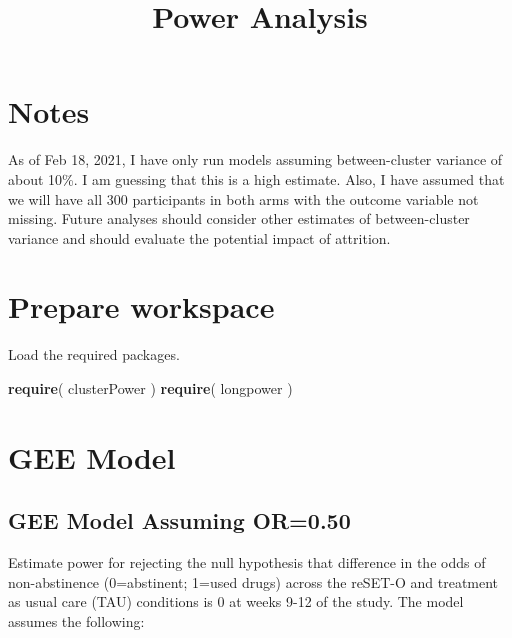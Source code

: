 \documentclass[
]{article}
\title{Power Analysis}
\author{}
\date{\vspace{-2.5em}}
\newenvironment{Shaded}{\begin{snugshade}}{\end{snugshade}}
\newcommand{\KeywordTok}[1]{\textcolor[rgb]{0.13,0.29,0.53}{\textbf{#1}}}
\newcommand{\NormalTok}[1]{#1}
\begin{document}
\maketitle

{
\setcounter{tocdepth}{1}
\tableofcontents
}
\hypertarget{notes}{%
\section{Notes}\label{notes}}

As of Feb 18, 2021, I have only run models assuming between-cluster
variance of about 10\%. I am guessing that this is a high estimate.
Also, I have assumed that we will have all 300 participants in both arms
with the outcome variable not missing. Future analyses should consider
other estimates of between-cluster variance and should evaluate the
potential impact of attrition.

\hypertarget{prepare-workspace}{%
\section{Prepare workspace}\label{prepare-workspace}}

Load the required packages.

\begin{Shaded}
\begin{Highlighting}[]
\KeywordTok{require}\NormalTok{( clusterPower )}
\KeywordTok{require}\NormalTok{( longpower )}
\end{Highlighting}
\end{Shaded}

\hypertarget{gee-model}{%
\section{GEE Model}\label{gee-model}}

\hypertarget{gee-model-assuming-or0.50}{%
\subsection{GEE Model Assuming
OR=0.50}\label{gee-model-assuming-or0.50}}

Estimate power for rejecting the null hypothesis that difference in the
odds of non-abstinence (0=abstinent; 1=used drugs) across the reSET-O
and treatment as usual care (TAU) conditions is 0 at weeks 9-12 of the
study. The model assumes the following:
\end{document}
